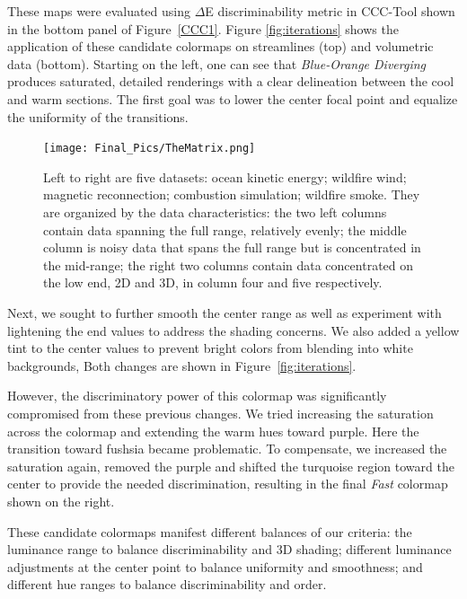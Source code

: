 \documentclass{IEEEcsmag}
\newcommand*{\colormap}[1]{\textsl{#1}\xspace}
\newcommand*{\blueorange}{\colormap{Blue-Orange Diverging}}
\newcommand*{\fast}{\colormap{Fast}}
\begin{document}

These maps were evaluated using $\Delta$E discriminability metric in CCC-Tool shown in the bottom panel of Figure~\ref{CCC1}. Figure \ref{fig:iterations} shows the application of these candidate colormaps on streamlines (top) and volumetric data (bottom).
Starting on the left, one can see that \blueorange produces saturated, detailed renderings with a clear delineation between the cool and warm sections.
The first goal was to lower the center focal point and equalize the uniformity of the transitions.

\begin{figure}[t]
\centering
\texttt{[image: Final\_Pics/TheMatrix.png]}
\caption{Left to right are five datasets: ocean kinetic energy; wildfire wind; magnetic reconnection; combustion simulation; wildfire smoke. They are organized by the data characteristics: the two left columns contain data spanning the full range, relatively evenly; the middle column is noisy data that spans the full range but is concentrated in the mid-range; the right two columns contain data concentrated on the low end, 2D and 3D, in column four and five respectively. }
\label{Matrix}
\end{figure}


Next, we sought to further smooth the center range as well as experiment with lightening the end values to address the shading concerns.
We also added a yellow tint to the center values to prevent bright colors from blending into white backgrounds, Both changes are shown in Figure~\ref{fig:iterations}. 


However, the discriminatory power of this colormap was significantly compromised from these previous changes. We tried increasing the saturation across the colormap and extending the warm hues toward purple. Here the transition toward fushsia became problematic. To compensate, we increased the saturation again, removed the purple and shifted the turquoise region toward the center to provide the needed discrimination, resulting in the final \fast colormap shown on the right.

These candidate colormaps manifest different balances of our criteria: the luminance range to balance discriminability and 3D shading; different luminance adjustments at the center point to balance uniformity and smoothness; and different hue ranges to balance discriminability and order. 
\end{document}
